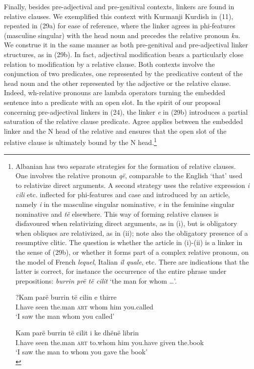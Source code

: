 \documentclass[output=paper]{langsci/langscibook}
\begin{document}
  Finally, besides pre-adjectival and pre-genitival contexts, linkers are found in relative clauses. We exemplified this context with Kurmanji Kurdish in (11), repeated in (29a) for ease of reference, where the linker agrees in phi-features (masculine singular) with the head noun and precedes the relative pronoun \textit{ku.} We construe it in the same manner as both pre-genitival and pre-adjectival linker structures, as in (29b). In fact, adjectival modification bears a particularly close relation to modification by a relative clause. Both contexts involve the conjunction of two predicates, one represented by the predicative content of the head noun and the other represented by the adjective or the relative clause. Indeed, wh-relative pronouns are lambda operators turning the embedded sentence into a predicate with an open slot. In the spirit of our proposal concerning pre-adjectival linkers in (24), the linker \textit{e} in (29b) introduces a partial saturation of the relative clause predicate. Agree applies between the embedded linker and the N head of the relative and ensures that the open slot of the relative clause is ultimately bound by the N head.\footnote{Albanian has two separate strategies for the formation of relative clauses. One involves the relative pronoun \textit{që}, comparable to the English ‘that’ used to relativize direct arguments. A second strategy uses the relative expression \textit{i} \textit{cili} etc. inflected for phi-features and case and introduced by an article, namely \textit{i} in the masculine singular nominative, \textit{e} in the feminine singular nominative and \textit{të} elsewhere. This way of forming relative clauses is disfavoured when relativizing direct arguments, as in (i), but is obligatory when obliques are relativized, as in (ii); note also the obligatory presence of a resumptive clitic. The question is whether the article in (i)-(ii) is a linker in the sense of (29b), or whether it forms part of a complex relative pronoun, on the model of French \textit{lequel}, Italian \textit{il quale}, etc. There are indications that the latter is correct, for instance the occurrence of the entire phrase under prepositions: \textit{burrin prë të cilit} ‘the man for whom …’.
  
  \ea   \gll    ?Kam  parë   burrin   të   cilin   e   thirre\\
                I.have   seen   the.man  \textsc{art}   whom  him   you.called\\
  \glt  ‘I saw the man whom you called’
  \z
  
  \ea   \gll    Kam  parë   burrin   të   cilit     i   ke     dhënë   librin\\
                I.have   seen  the.man  \textsc{art}   to.whom    him   you.have   given   the.book\\
        \glt    ‘I saw the man to whom you gave the book’\\
\z}  
\end{document}
